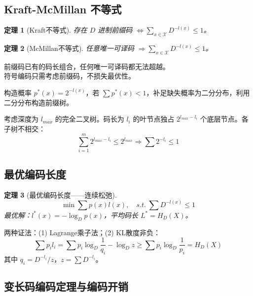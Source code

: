 \documentclass[12pt,a4paper]{ctexart}
\newtheorem{theorem}{定理}[section]
\theoremstyle{definition}
\newcommand{\XX}{\mathcal{X}}
\begin{document}
\subsection{Kraft-McMillan 不等式}

\begin{theorem}[Kraft不等式]
存在 $D$ 进制前缀码 $\iff \displaystyle\sum_{x\in\XX} D^{-l(x)} \leq 1$。
\end{theorem}

\begin{theorem}[McMillan不等式]
任意唯一可译码 $\Rightarrow \displaystyle\sum_{x\in\XX} D^{-l(x)} \leq 1$。
\end{theorem}

\begin{keybox}[核心结论]
前缀码已有的码长组合，任何唯一可译码都无法超越。\\
符号编码只需考虑前缀码，不损失最优性。
\end{keybox}

\begin{proofbox}[Kraft充分性证明]
构造概率 $p^*(x) = 2^{-l(x)}$，若 $\sum p^*(x) < 1$，补足缺失概率为二分分布，利用二分分布构造前缀树。
\end{proofbox}

\begin{proofbox}[Kraft必要性证明]
考虑深度为 $l_{max}$ 的完全二叉树。码长为 $l_i$ 的叶节点独占 $2^{l_{max}-l_i}$ 个底层节点。各子树不相交：
\[
\sum_{i=1}^m 2^{l_{max}-l_i} \leq 2^{l_{max}} \Rightarrow \sum 2^{-l_i} \leq 1
\]
\end{proofbox}

\subsection{最优编码长度}

\begin{theorem}[最优编码长度——连续松弛]
\[
\min \sum p(x)l(x), \quad s.t. \; \sum D^{-l(x)} \leq 1
\]
最优解：$l^*(x) = -\log_D p(x)$，平均码长 $L^* = H_D(X)$。
\end{theorem}

两种证法：(1) Lagrange乘子法；(2) KL散度非负：
\[
\sum p_i l_i = \sum p_i \log_D \frac{1}{q_i} - \log_D z \geq \sum p_i \log_D \frac{1}{p_i} = H_D(X)
\]
其中 $q_i = D^{-l_i}/z$，$z = \sum D^{-l_i}$。

\subsection{变长码编码定理与编码开销}
\end{document}
